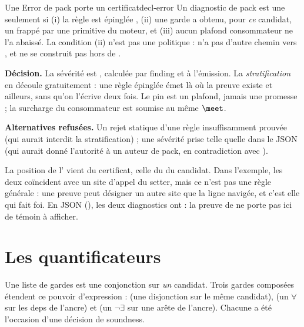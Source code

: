 \begin{invariant}{Une Error de pack porte un certificat}{decl-error}
Un diagnostic de pack est une \Error{} seulement si (i) la règle est épinglée , (ii) une garde  a obtenu, pour \emph{ce} candidat, un  frappé par une primitive du moteur, et (iii) aucun plafond consommateur ne l'a abaissé. La condition (ii) n'est pas une politique :  n'a pas d'autre chemin vers , et  ne se construit pas hors de .
\end{invariant}

\begin{decision}
\textbf{Décision.} La sévérité est , calculée par finding et à l'émission. La \emph{stratification} en découle gratuitement : une règle épinglée  émet \Error{} là où la preuve existe et \Warning{} ailleurs, sans qu'on l'écrive deux fois. Le pin est un plafond, jamais une promesse ; la surcharge du consommateur est soumise au même $\meet$.

\textbf{Alternatives refusées.} Un rejet statique d'une règle  \og insuffisamment prouvée\fg{} (qui aurait interdit la stratification) ; une sévérité prise telle quelle dans le JSON (qui aurait donné l'autorité \Error{} à un auteur de pack, en contradiction avec ).
\end{decision}

\begin{remarque}
La position de l'\Error{} vient du certificat, celle du \Warning{} du candidat. Dans l'exemple, les deux coïncident avec un site d'appel du setter, mais ce n'est pas une règle générale : une preuve peut désigner un autre site que la ligne navigée, et c'est elle qui fait foi. En JSON (), les deux diagnostics ont  : la preuve de  ne porte pas ici de témoin à afficher.
\end{remarque}

\section{Les quantificateurs}
\label{sec:regles-declaratives-quantificateurs}

Une liste de gardes est une conjonction sur \emph{un} candidat. Trois gardes composées étendent ce pouvoir d'expression :  (une disjonction sur le même candidat),  (un $\forall$ sur les deps de l'ancre) et  (un $\neg\exists$ sur une arête de l'ancre). Chacune a été l'occasion d'une décision de soundness.

